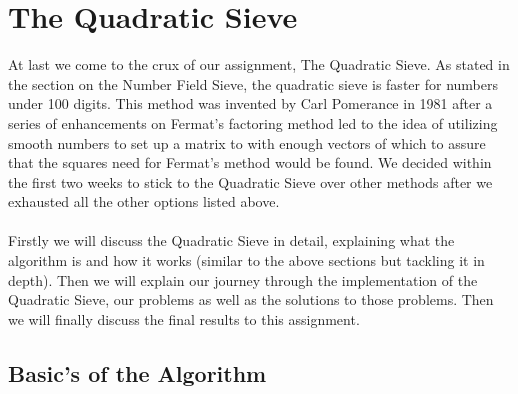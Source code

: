 \documentclass[12pt]{article} %
\begin{document}
\section{The Quadratic Sieve}
At last we come to the crux of our assignment, The Quadratic Sieve. As stated in the section on the Number Field Sieve, the quadratic sieve is faster for numbers under 100 digits. This method was invented by Carl Pomerance in 1981 after a series of enhancements on Fermat's factoring method led to the idea of utilizing smooth numbers to set up a matrix to with enough vectors of which to assure that the squares need for Fermat's method would be found. We decided within the first two weeks to stick to the Quadratic Sieve over other methods after we exhausted all the other options listed above.
\\\\
Firstly we will discuss the Quadratic Sieve in detail, explaining what the algorithm is and how it works (similar to the above sections but tackling it in depth). Then we will explain our journey through the implementation of the Quadratic Sieve, our problems as well as the solutions to those problems. Then we will finally discuss the final results to this assignment.
\subsection{Basic's of the Algorithm}
\end{document}
